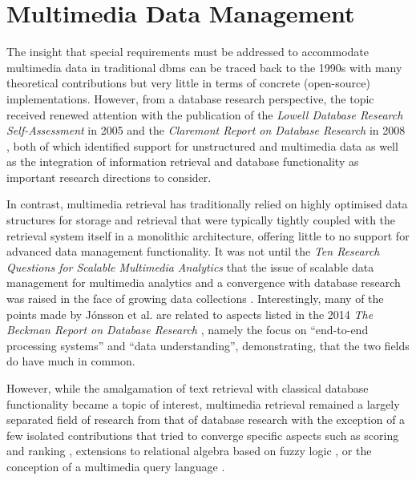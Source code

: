 \chapter{Multimedia Data Management}
\label{chapter:theory_multimedia_database}

The insight that special requirements must be addressed to accommodate multimedia data in traditional \acrshort{dbms} can be traced back to the 1990s \cite{Marcus:1996Foundations,Adjeroh:1997Multimedia} with many theoretical contributions but very little in terms of concrete (open-source) implementations. However, from a database research perspective, the topic received renewed attention with the publication of the \emph{Lowell Database Research Self-Assessment} in 2005 \cite{Abiteboul:2005Lowell} and the \emph{Claremont Report on Database Research} in 2008 \cite{Agrawal:2008Claremont}, both of which identified support for unstructured and multimedia data as well as the integration of information retrieval and database functionality as important research directions to consider.

In contrast, multimedia retrieval has traditionally relied on highly optimised data structures for storage and retrieval that were typically tightly coupled with the retrieval system itself in a monolithic architecture, offering little to no support for advanced data management functionality. It was not until the \emph{Ten Research Questions for Scalable Multimedia Analytics} \cite{Jonsson:2016Ten} that the issue of scalable data management for multimedia analytics and a convergence with database research was raised in the face of growing data collections \cite{Berns:2019V3C1,Rossetto:2021Insights}. Interestingly, many of the points made by Jónsson et al. are related to aspects listed in the 2014 \emph{The Beckman Report on Database Research} \cite{Abadi:2014Beckman}, namely the focus on ``end-to-end processing systems'' and ``data understanding'', demonstrating, that the two fields do have much in common.

However, while the amalgamation of text retrieval with classical database functionality became a topic of interest, multimedia retrieval remained a largely separated field of research from that of database research with the exception of a few isolated contributions that tried to converge specific aspects such as scoring and ranking \cite{Chengkai:2005RankSQL,Zhang:2006Boolean}, extensions to relational algebra based on fuzzy logic \cite{Montesi:1999Similarity}, or the conception of a multimedia query language \cite{Budikova:2012Query}.


